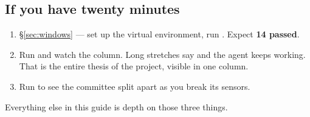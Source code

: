 \subsection{If you have twenty minutes}

\begin{enumerate}[leftmargin=*,itemsep=3pt]
  \item \S\ref{sec:windows} --- set up the virtual environment, run .
        Expect \textbf{14 passed}.
  \item Run  and watch the  column.
        Long stretches say  and the agent keeps working. That is the
        entire thesis of the project, visible in one column.
  \item Run  to see the committee split apart
        as you break its sensors.
\end{enumerate}

Everything else in this guide is depth on those three things.

